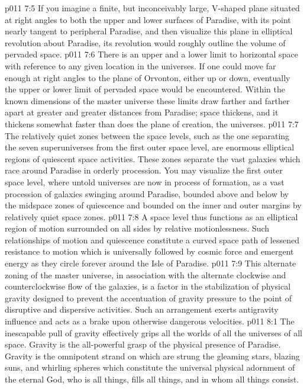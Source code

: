 \vs p011 7:5 If you imagine a finite, but inconceivably large, V\hyp{}shaped plane situated at right angles to both the upper and lower surfaces of Paradise, with its point nearly tangent to peripheral Paradise, and then visualize this plane in elliptical revolution about Paradise, its revolution would roughly outline the volume of pervaded space.
\vs p011 7:6 There is an upper and a lower limit to horizontal space with reference to any given location in the universes. If one could move far enough at right angles to the plane of Orvonton, either up or down, eventually the upper or lower limit of pervaded space would be encountered. Within the known dimensions of the master universe these limits draw farther and farther apart at greater and greater distances from Paradise; space thickens, and it thickens somewhat faster than does the plane of creation, the universes.
\vs p011 7:7 \pc The relatively quiet zones between the space levels, such as the one separating the seven superuniverses from the first outer space level, are enormous elliptical regions of quiescent space activities. These zones separate the vast galaxies which race around Paradise in orderly procession. You may visualize the first outer space level, where untold universes are now in process of formation, as a vast procession of galaxies swinging around Paradise, bounded above and below by the midspace zones of quiescence and bounded on the inner and outer margins by relatively quiet space zones.
\vs p011 7:8 A space level thus functions as an elliptical region of motion surrounded on all sides by relative motionlessness. Such relationships of motion and quiescence constitute a curved space path of lessened resistance to motion which is universally followed by cosmic force and emergent energy as they circle forever around the Isle of Paradise.
\vs p011 7:9 This alternate zoning of the master universe, in association with the alternate clockwise and counterclockwise flow of the galaxies, is a factor in the stabilization of physical gravity designed to prevent the accentuation of gravity pressure to the point of disruptive and dispersive activities. Such an arrangement exerts antigravity influence and acts as a brake upon otherwise dangerous velocities.
\vs p011 8:1 The inescapable pull of gravity effectively grips all the worlds of all the universes of all space. Gravity is the all\hyp{}powerful grasp of the physical presence of Paradise. Gravity is the omnipotent strand on which are strung the gleaming stars, blazing suns, and whirling spheres which constitute the universal physical adornment of the eternal God, who is all things, fills all things, and in whom all things consist.
